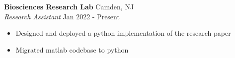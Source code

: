 \vspace{1mm}

\textbf{Biosciences Research Lab} \hfill Camden, NJ\\
\textit{Research Assistant} \hfill Jan 2022 - Present\\
\vspace{-1mm}
\begin{itemize} \itemsep 1pt
	\item Designed and deployed a python implementation of the research paper
  \item Migrated matlab codebase to python
\end{itemize}

